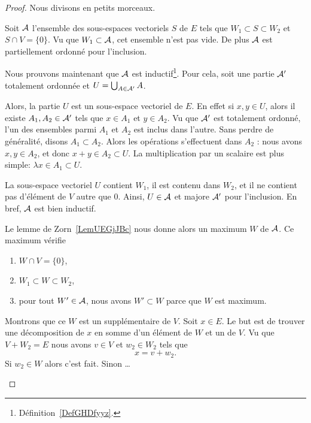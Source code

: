 \begin{proof}
    Nous divisons en petits morceaux.
    \begin{subproof}
        \item[Un gros ensemble]
            Soit \( \mA\) l'ensemble des sous-espaces vectoriels \( S\) de \( E\) tels que \( W_1\subset S\subset W_2\) et \( S\cap V=\{ 0 \}\). Vu que \( W_1\subset \mathcal{A}\), cet ensemble n'est pas vide. De plus \( \mA\) est partiellement ordonné pour l'inclusion.
        \item[\( \mA\) est inductif]
            Nous prouvons maintenant que \( \mA\) est inductif\footnote{Définition~\ref{DefGHDfyyz}.}. Pour cela, soit une partie \( \mathcal{A}'\) totalement ordonnée et \( U=\bigcup_{A\in \mathcal{A}'}A\).

            Alors, la partie \( U\) est un sous-espace vectoriel de \( E\). En effet si \( x,y\in U\), alors il existe \( A_1,A_2\in\mathcal{A}'\) tels que \( x\in A_1\) et \( y\in A_2\). Vu que \( \mathcal{A}'\) est totalement ordonné, l'un des ensembles parmi \( A_1\) et \( A_2\) est inclus dans l'autre. Sans perdre de généralité, disons \( A_1\subset A_2\). Alors les opérations s'effectuent dans \( A_2 \) : nous avons \( x,y\in A_2\), et donc \( x+y\in A_2\subset U\). La multiplication par un scalaire est plus simple:  \( \lambda x\in A_1\subset U\).

            La sous-espace vectoriel \( U \) contient \( W_1 \), il est contenu dans \( W_2\), et il ne contient pas d'élément de \( V \) autre que \( 0 \). Ainsi, \( U\in \mathcal{A}\) et majore \( \mathcal{A}'\) pour l'inclusion. En bref, \( \mA\) est bien inductif.
        \item[Utilisation de Zorn]

            Le lemme de Zorn~\ref{LemUEGjJBc} nous donne alors un maximum \( W\) de \( \mA\). Ce maximum vérifie
            \begin{enumerate}
                \item
                    \( W\cap V=\{ 0 \}\),
                \item
                    \( W_1\subset W\subset W_2\),
                \item
                    pour tout \( W'\in\mathcal{A}\), nous avons \( W'\subset W\) parce que \( W\) est maximum.
            \end{enumerate}
        \item[Supplémentaire]
            Montrons que ce \( W\) est un supplémentaire de \( V\). Soit \( x\in E\). Le but est de trouver une décomposition de \( x\) en somme d'un élément de \( W\) et un de \( V\). Vu que \( V+W_2=E\) nous avons \( v\in V\) et \( w_2\in W_2\) tels que 
            \begin{equation}
                x=v+w_2. 
            \end{equation}
            Si \( w_2\in W\) alors c'est fait. Sinon \ldots


\end{subproof}
\end{proof}
